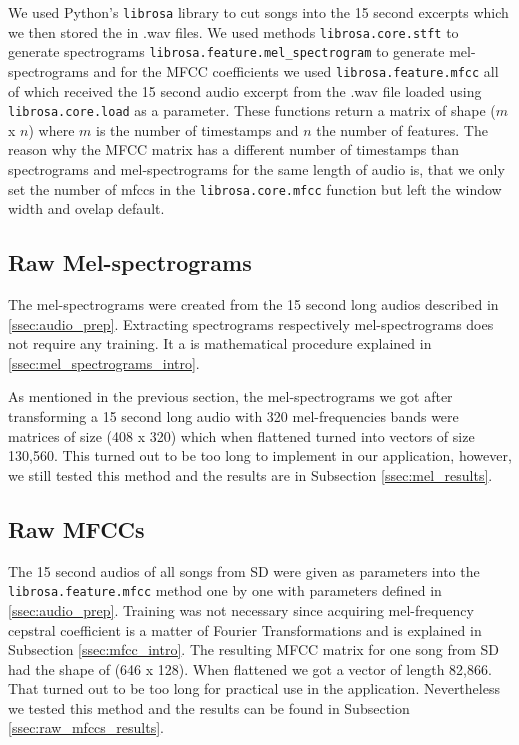 We used Python's \texttt{librosa} library \cite{brian_mcfee_2019_2564164} to cut songs into the 15 second excerpts which we then stored the in .wav files. We used methods \texttt{librosa.core.stft} to generate spectrograms \texttt{librosa.feature.mel\_spectrogram} to generate mel-spectrograms and for the MFCC coefficients we used \texttt{librosa.feature.mfcc} all of which received the 15 second audio excerpt from the .wav file loaded using \texttt{librosa.core.load} as a parameter. These functions return a matrix of shape ($m$ x $n$) where $m$ is the number of timestamps and $n$ the number of features. The reason why the MFCC matrix has a different number of timestamps than spectrograms and mel-spectrograms for the same length of audio is, that we only set the number of mfccs in the \texttt{librosa.core.mfcc} function but left the window width and ovelap default.

\subsection{Raw Mel-spectrograms}\label{ssec:raw_mels_experiments}
The mel-spectrograms were created from the 15 second long audios described in \ref{ssec:audio_prep}. Extracting spectrograms respectively mel-spectrograms does not require any training. It a is mathematical procedure explained in \ref{ssec:mel_spectrograms_intro}. 

As mentioned in the previous section, the mel-spectrograms we got after transforming a 15 second long audio with 320 mel-frequencies bands were matrices of size (408 x 320) which when flattened turned into vectors of size 130,560. This turned out to be too long to implement in our application, however, we still tested this method and the results are in Subsection \ref{ssec:mel_results}. 

\subsection{Raw MFCCs}\label{ssec:raw_mfccs_experiments}
The 15 second audios of all songs from SD were given as parameters into the \texttt{librosa.feature.mfcc} method one by one with parameters defined in \ref{ssec:audio_prep}. Training was not necessary since acquiring mel-frequency cepstral coefficient is a matter of Fourier Transformations and is explained in Subsection  \ref{ssec:mfcc_intro}. The resulting MFCC matrix for one song from SD had the shape of (646 x 128). When flattened we got a vector of length 82,866. That turned out to be too long for practical use in the application. Nevertheless we tested this method and the results can be found in Subsection \ref{ssec:raw_mfccs_results}.

